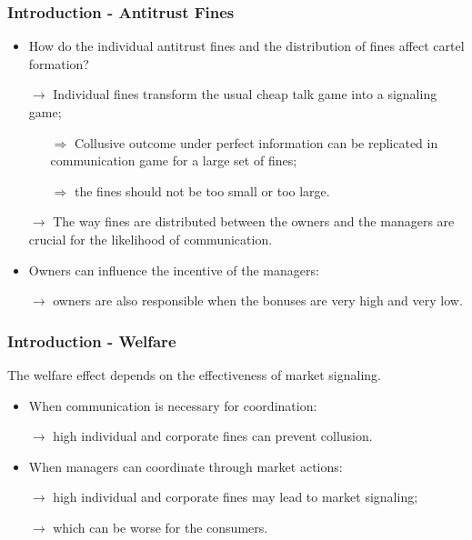 \documentclass[xcolor=dvipsnames]{beamer}
\begin{document}
\begin{frame}
\frametitle{Introduction - Antitrust Fines}
\begin{itemize}
    \item How do the individual antitrust fines and the distribution of fines affect cartel formation?

    \item[] $\rightarrow$ Individual fines transform the usual cheap talk game into a signaling game;
	
	\begin{itemize}
	    \item[$\Rightarrow$] Collusive outcome under perfect information can be replicated in communication game for a large set of fines;
	    
	    \item[$\Rightarrow$] the fines should not be too small or too large.
	\end{itemize}
	
	\item[] $\rightarrow$ The way fines are distributed between the owners and the managers are crucial for the likelihood of communication.
	
	\item Owners can influence the incentive of the managers:
	
	\item[] $\rightarrow$ owners are also responsible when the bonuses are very high and very low.
\end{itemize}
\end{frame}

\begin{frame}
\frametitle{Introduction - Welfare}
The welfare effect depends on the effectiveness of market signaling.
\begin{itemize}
	\item When communication is necessary for coordination:
	
	\item[] $\rightarrow$ high individual and corporate fines can prevent collusion.
	
	\item When managers can coordinate through market actions:
	
	\item[] $\rightarrow$ high individual and corporate fines may lead to market signaling;
	
	\item[] $\rightarrow$ which can be worse for the consumers.
\end{itemize}
\end{frame}
\end{document}
